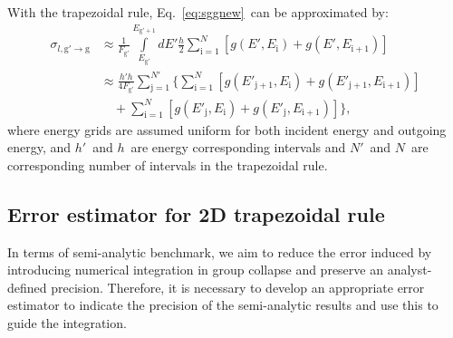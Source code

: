 \documentclass[review]{elsarticle}
\newcommand{\fgp}{F_\mathrm{g'}}
\newcommand{\sgg}{\sigma_{l,\mathrm{g'}\to \mathrm{g}}}
\newcommand{\egp}{E_\mathrm{g'}}
\newcommand{\egpo}{E_\mathrm{g'+1}}
\begin{document}
With the trapezoidal rule, Eq.~\eqref{eq:sggnew}~can be approximated by:
\begin{align}\label{eq:sggapp}
\sgg&\approx\frac{1}{\fgp}\int\limits_{\egp}^{\egpo} dE'\frac{h}{2}\sum\limits_{\mathrm{i=}1}^{N}\left[g(E',E_\mathrm{i})+g(E',E_\mathrm{i+1})\right]\nonumber\\
 &\approx\frac{h'h}{4\fgp}\sum\limits_{\mathrm{j=}1}^{N'}\Bigg\{\sum\limits_{\mathrm{i=}1}^{N}\left[g\left(E'_\mathrm{j+1},E_\mathrm{i}\right)+g\left(E'_\mathrm{j+1},E_\mathrm{i+1}\right)\right]\\
 &\quad+\sum\limits_{\mathrm{i=}1}^{N}\left[g\left(E'_\mathrm{j},E_\mathrm{i}\right)+g\left(E'_\mathrm{j},E_\mathrm{i+1}\right)\right]\Bigg\}\nonumber,
\end{align}
where energy grids are assumed uniform for both incident energy and outgoing energy, and $h'$~and $h$~are energy corresponding intervals and $N'$~and $N$~are corresponding number of intervals in the trapezoidal rule.

\subsection{Error estimator for 2D trapezoidal rule}
In terms of semi-analytic benchmark, we aim to reduce the error induced by introducing numerical integration in group collapse and preserve an analyst-defined precision. Therefore, it is necessary to develop an appropriate error estimator to indicate the precision of the semi-analytic results and use this to guide the integration.
\end{document}
